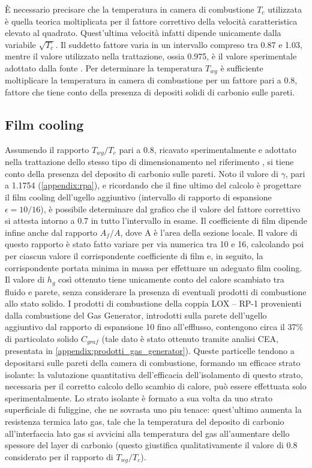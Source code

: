È necessario precisare che la temperatura in camera di combustione $T_c$ utilizzata è quella teorica moltiplicata per il fattore correttivo della velocità caratteristica elevato al quadrato. Quest'ultima velocità infatti dipende unicamente dalla variabile $\sqrt{T_c}$. Il suddetto fattore varia in un intervallo compreso tra 0.87 e 1.03, mentre il valore utilizzato nella trattazione, ossia 0.975, è il valore sperimentale adottato dalla fonte \cite{AIAA_book_1}.
Per determinare la temperatura $T_{wg}$ è sufficiente moltiplicare la temperatura in camera di combustione per un fattore pari a 0.8, fattore che tiene conto della presenza di depositi solidi di carbonio sulle pareti.


\subsection{Film cooling}


Assumendo il rapporto $T_{wg}/T_c$ pari a 0.8, ricavato sperimentalmente e adottato nella trattazione dello stesso tipo di dimensionamento nel riferimento \cite{AIAA_book_2}, si tiene conto della presenza del deposito di carbonio sulle pareti. Noto il valore di $\gamma$, pari a 1.1754 (\autoref{appendix:rpa}), e ricordando che il fine ultimo del calcolo è progettare il film cooling dell'ugello aggiuntivo (intervallo di rapporto di espansione $\epsilon=10/16$), è possibile determinare dal grafico che il valore del fattore correttivo si attesta intorno a 0.7 in tutto l'intervallo in esame.
Il coefficiente di film dipende infine anche dal rapporto $A_f/A$, dove A è l'area della sezione locale. Il valore di questo rapporto è stato fatto variare per via numerica tra 10 e 16, calcolando poi per ciascun valore il corrispondente coefficiente di film e, in seguito, la corrispondente portata minima in massa per effettuare un adeguato film cooling.
Il valore di $h_g$ così ottenuto tiene unicamente conto del calore scambiato tra fluido e parete, senza considerare la presenza di eventuali prodotti di combustione allo stato solido. I prodotti di combustione della coppia LOX – RP-1 provenienti dalla combustione del Gas Generator, introdotti sulla parete dell'ugello aggiuntivo dal rapporto di espansione 10 fino all'efflusso, contengono circa il 37\% di particolato solido $C_{graf}$ (tale dato è stato  ottenuto tramite analisi CEA, presentata in \autoref{appendix:prodotti_gas_generator}). Queste particelle tendono a depositarsi sulle pareti della camera di combustione, formando un efficace strato isolante: la valutazione quantitativa dell’efficacia dell’isolamento di questo strato, necessaria per il corretto calcolo dello scambio di calore, può essere effettuata solo sperimentalmente. Lo strato isolante è formato a sua volta da uno strato superficiale di fuliggine, che ne sovrasta uno piu tenace: quest’ultimo aumenta la resistenza termica lato gas, tale che la temperatura del deposito di carbonio all’interfaccia lato gas si avvicini alla temperatura del gas all’aumentare dello spessore del layer di carbonio (questo giustifica qualitativamente il valore di 0.8 considerato per il rapporto di $T_{wg}/T_c$).

